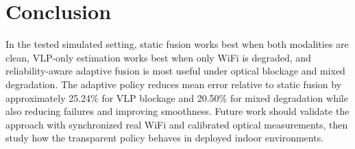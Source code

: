 \documentclass[conference]{IEEEtran}
\begin{document}
\section{Conclusion}
In the tested simulated setting, static fusion works best when both modalities are clean, VLP-only estimation works best when only WiFi is degraded, and reliability-aware adaptive fusion is most useful under optical blockage and mixed degradation. The adaptive policy reduces mean error relative to static fusion by approximately 25.24\% for VLP blockage and 20.50\% for mixed degradation while also reducing failures and improving smoothness. Future work should validate the approach with synchronized real WiFi and calibrated optical measurements, then study how the transparent policy behaves in deployed indoor environments.

\balance


\end{document}
